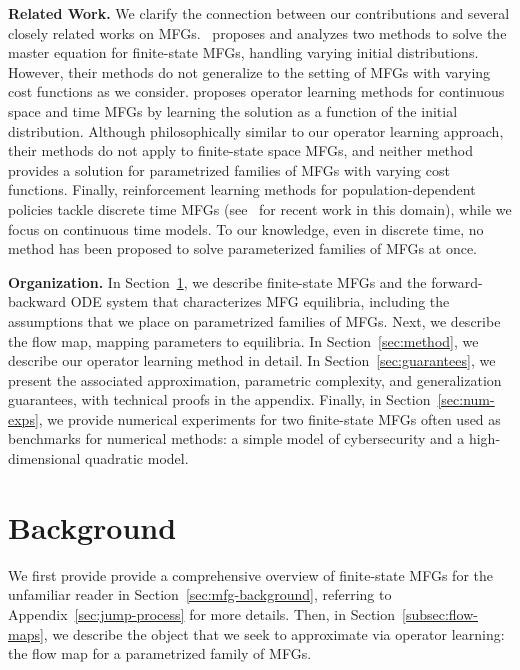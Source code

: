 \documentclass[11pt,reqno]{amsart}
\numberwithin{equation}{section}
\theoremstyle{plain}
\newcommand{\1}{\boldsymbol{\mathbbm{1}}}
\begin{document}
\noindent\textbf{Related Work.} We clarify the connection between our contributions and several closely related works on MFGs.~\cite{coh-lau-zel2025} proposes and analyzes two methods to solve the master equation for finite-state MFGs, handling varying initial distributions. However, their methods do not generalize to the setting of MFGs with varying cost functions as we consider. 
\cite{chen2023physicsinformed,Huang2025} proposes operator learning methods for continuous space and time MFGs by learning the solution as a function of the initial distribution. Although philosophically similar to our operator learning approach, their methods do not apply to finite-state space MFGs, and neither method provides a solution for parametrized families of MFGs with varying cost functions. 
Finally, reinforcement learning methods for population-dependent policies tackle discrete time MFGs (see~\cite{perrin2022generalization,li2023populationsizeaware, zhang2025stochastic, wu2025population} for recent work in this domain), while we focus on continuous time models. To our knowledge, even in discrete time, no method has been proposed to solve parameterized families of MFGs at once.

\noindent\textbf{Organization.} In Section~\ref{sec:background-all}, we describe finite-state MFGs and the forward-backward ODE system that characterizes MFG equilibria, including the assumptions that we place on parametrized families of MFGs. Next, we describe the flow map, mapping parameters to equilibria. In Section~\ref{sec:method}, we describe our operator learning method in detail. In Section~\ref{sec:guarantees}, we present the associated approximation, parametric complexity, and generalization guarantees, with technical proofs in the appendix. Finally, in Section~\ref{sec:num-exps}, we provide numerical experiments for two finite-state MFGs often used as benchmarks for numerical methods: a simple model of cybersecurity and a high-dimensional quadratic model.

\section{Background}
\label{sec:background-all}
We first provide provide a comprehensive overview of finite-state MFGs for the unfamiliar reader in Section~\ref{sec:mfg-background}, referring to Appendix~\ref{sec:jump-process} for more details. Then, in Section~\ref{subsec:flow-maps}, we describe the object that we seek to approximate via operator learning: the flow map for a parametrized family of MFGs.
\end{document}
